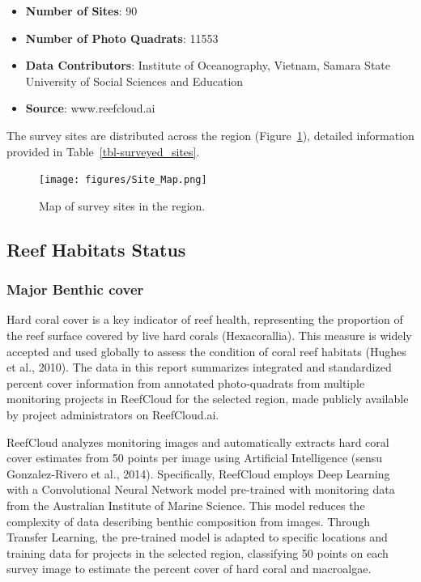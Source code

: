 \documentclass[
  letterpaper,
  DIV=11,
  numbers=noendperiod]{scrartcl}
\providecommand{\tightlist}{%
  \setlength{\itemsep}{0pt}\setlength{\parskip}{0pt}}\usepackage{longtable,booktabs,array}
\begin{document}
\begin{itemize}
\tightlist
\item
  \textbf{Number of Sites}: 90
\item
  \textbf{Number of Photo Quadrats}: 11553
\item
  \textbf{Data Contributors}: Institute of Oceanography, Vietnam, Samara
  State University of Social Sciences and Education
\item
  \textbf{Source}: www.reefcloud.ai
\end{itemize}

The survey sites are distributed across the region
(Figure~\ref{fig-map}), detailed information provided in
Table~\ref{tbl-surveyed_sites}.

\begin{figure}[H]

\texttt{[image: figures/Site\_Map.png]}

\caption{\label{fig-map}Map of survey sites in the region.}

\end{figure}%

\subsection{Reef Habitats Status}\label{reef-habitats-status}

\subsubsection{Major Benthic cover}\label{major-benthic-cover}

Hard coral cover is a key indicator of reef health, representing the
proportion of the reef surface covered by live hard corals
(Hexacorallia). This measure is widely accepted and used globally to
assess the condition of coral reef habitats (Hughes et al., 2010). The
data in this report summarizes integrated and standardized percent cover
information from annotated photo-quadrats from multiple monitoring
projects in ReefCloud for the selected region, made publicly available
by project administrators on ReefCloud.ai.

ReefCloud analyzes monitoring images and automatically extracts hard
coral cover estimates from 50 points per image using Artificial
Intelligence (sensu Gonzalez-Rivero et al., 2014). Specifically,
ReefCloud employs Deep Learning with a Convolutional Neural Network
model pre-trained with monitoring data from the Australian Institute of
Marine Science. This model reduces the complexity of data describing
benthic composition from images. Through Transfer Learning, the
pre-trained model is adapted to specific locations and training data for
projects in the selected region, classifying 50 points on each survey
image to estimate the percent cover of hard coral and macroalgae.
\end{document}
